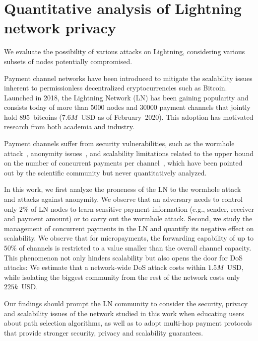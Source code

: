 \chapter{Quantitative analysis of Lightning network privacy}

\label{Chapter07LNattacks}

We evaluate the possibility of various attacks on Lightning, considering various subsets of nodes potentially compromised.


Payment channel networks have been introduced to mitigate the scalability issues inherent to permissionless decentralized cryptocurrencies such as Bitcoin.
Launched in 2018, the Lightning Network (LN) has 
been gaining popularity and 
consists today of more than $5000$ nodes and $30000$ payment channels 
that jointly hold $895$~bitcoins ($7.6M$~USD as of February~2020).
This adoption has motivated research from both academia and industry.

Payment channels suffer from security vulnerabilities, such as the wormhole attack~\cite{Malavolta2019}, anonymity issues~\cite{Malavolta2017}, and scalability limitations related to  the upper bound on the number of concurrent payments per channel~\cite{EmelyanenkoK2017}, which have been pointed out by the scientific community but never quantitatively analyzed. 

In this work, we first analyze the proneness of the LN to the wormhole attack and attacks against anonymity. 
We observe that an adversary needs to control only $2\%$ of LN nodes to learn sensitive payment information (e.g., sender, receiver and payment amount) or to carry out the wormhole attack. 
Second, we study the management of concurrent payments in the LN and quantify its negative effect on scalability. 
We observe that for micropayments, the forwarding capability of up to $50\%$ of channels is restricted to 
a value smaller than the overall channel capacity.
This phenomenon not only hinders scalability but also opens the door for DoS attacks: We estimate that 
a network-wide DoS attack costs within $1.5M$~USD, while isolating the biggest community from the rest of the network costs only $225k$~USD.

Our findings should prompt the LN community to consider the security, privacy and scalability issues of the network studied in this work 
when educating users about path selection algorithms, as well as to adopt multi-hop payment protocols that provide stronger security, privacy and 
scalability guarantees. 












